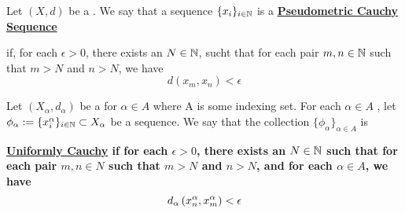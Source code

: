 \label{def:pseudometriccauchysequence}
\newcommand{\PseudometricCauchySequence}[0]{
    \bf \hyperref[def:pseudometriccauchysequence]{Pseudometric Cauchy Sequence} \rm
}
\begin{df}

    Let $(X,d)$ be a \PseudometricSpace.
    We say that a sequence $\{x_i\}_{i \in \mathbb{N}}$ is a \PseudometricCauchySequence
    if, for each $\epsilon > 0$, there exists an $N \in \mathbb{N}$, sucht that for 
    each pair $m,n \in \mathbb{N}$ such that $m>N$ and $n>N$, we have 
    \begin{equation}
        d(x_m,x_n) < \epsilon
    \end{equation}
\end{df}
\label{def:uniformlycauchy}
\newcommand{\UniformlyCauchy}[0]{
    \bf \hyperref[def:uniformlycauchy]{Uniformly Cauchy} \rm
}
\begin{df}
	Let $(X_\alpha, d_\alpha)$ be a \PseudometricSpace
	for $\alpha \in A$ where A is some indexing set. 
	For each $\alpha \in A$
	, let $\phi_\alpha :=\{x_i^\alpha\}_{i \in \mathbb{N}} \subset X_{\alpha}$
	be a sequence. 
	We say that the collection $\{\phi_\alpha\}_{\alpha \in A}$ 
	is 
	\UniformlyCauchy if for each $\epsilon > 0$, there exists an 
	$N \in \mathbb{N}$ such that for each pair $m,n \in N$
	such that $m>N$ and $n>N$, and for each $\alpha \in A$, 
	we have 
	\begin{equation}
	d_{\alpha} \left( x^{\alpha}_n, x^{\alpha}_m\right) < \epsilon
	\end{equation}
\end{df}